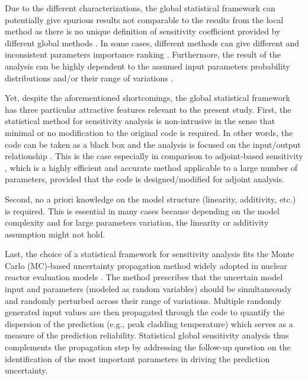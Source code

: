 Due to the different characterizations, the global statistical framework can potentially give spurious results not comparable to the results from the local method as there is no unique definition of sensitivity coefficient provided by different global methods \cite{Razavi2015}. 
In some cases, different methods can give different and inconsistent parameters importance ranking \cite{Saltelli2008,Saltelli2004}.
Furthermore, the result of the analysis can be highly dependent to the assumed input parameters probability distributions and/or their range of variations \cite{Cacuci2004,Cacuci2010}.

Yet, despite the aforementioned shortcomings, 
the global statistical framework has three particular attractive features relevant to the present study. 
First, the statistical method for sensitivity analysis is non-intrusive in the sense that minimal or no modification to the original code is required. 
In other words, the code can be taken as a black box and the analysis is focused on the input/output relationship \cite{Saltelli2008}. 
This is the case especially in comparison to adjoint-based sensitivity \cite{Cacuci2000,Ionescu-Bujor2000}, which is a highly efficient and accurate method applicable to a large number of parameters, 
provided that the code is designed/modified for adjoint analysis.

Second, no a priori knowledge on the model structure (linearity, additivity, etc.) is required. 
This is essential in many cases because depending on the model complexity and for large parameters variation,
the linearity or additivity assumption might not hold.

Last, 
the choice of a statistical framework for sensitivity analysis fits the Monte Carlo (MC)-based uncertainty propagation method widely adopted in nuclear reactor evaluation models \cite{Boyack1990, Nutt2004, Wallis2007, Glaeser2008}. 
The method prescribes that the uncertain model input and parameters (modeled as random variables) 
should be simultaneously and randomly perturbed across their range of variations. 
Multiple randomly generated input values are then propagated through the code to quantify the dispersion of the prediction (e.g., peak cladding temperature) 
which serves as a measure of the prediction reliability. 
Statistical global sensitivity analysis thus complements the propagation step 
by addressing the follow-up question on the identification of the most important parameters in driving the prediction uncertainty. 

